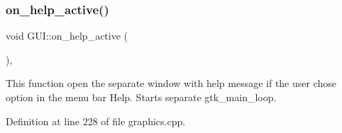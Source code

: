 \subsubsection{\texorpdfstring{on\_help\_active()}{on\_help\_active()}}
{\footnotesize\ttfamily void G\+U\+I\+::on\+\_\+help\+\_\+active (\begin{DoxyParamCaption}{ }\end{DoxyParamCaption})\hspace{0.3cm}{\ttfamily [static]}, {\ttfamily [protected]}}



This function open the separate window with help message if the user chose option in the menu bar Help. Starts separate gtk\+\_\+main\+\_\+loop. 



Definition at line 228 of file graphics.\+cpp.


